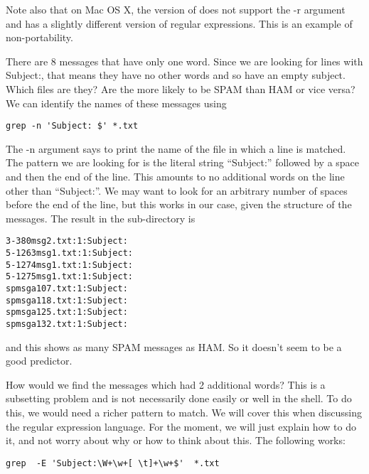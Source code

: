 Note also that on Mac OS X,  the version of  does not 
support the -r argument and has a slightly different version of
regular expressions.  This is an example of non-portability.

There are 8 messages that have only one word. Since we
are looking for lines with Subject:, that means they have
no other words and so have an empty subject.
Which files are they?  Are the more likely to be SPAM than HAM or
vice versa?
We can identify the names of these messages using
\begin{verbatim}
grep -n 'Subject: $' *.txt
\end{verbatim}
The -n argument says to print the name of the file in which a line is
matched.
The pattern we are looking for is the literal string ``Subject:''
followed by a space and then the end of the line.
This amounts to no additional words on the line other than ``Subject:''.
We may want to look for an arbitrary number of spaces before the end
of the line, but this works in our case, given the structure of the messages.
The result in the  sub-directory is
\begin{verbatim}
3-380msg2.txt:1:Subject: 
5-1263msg1.txt:1:Subject: 
5-1274msg1.txt:1:Subject: 
5-1275msg1.txt:1:Subject: 
spmsga107.txt:1:Subject: 
spmsga118.txt:1:Subject: 
spmsga125.txt:1:Subject: 
spmsga132.txt:1:Subject: 
\end{verbatim}
and this shows as many SPAM messages as HAM. So it doesn't seem to be
a good predictor.




\begin{comment}
Another approach to the whole problem is to iterate over all the
messages
and append the name of the message file to a ``list'' containing other
messages with that number of words in the subject line.
\begin{verbatim}
for i in `ls *.txt` ; do 
  grep 'Subject:' $i | wc -w | grep -v total | sed -re 's/^ +([0-9]+).*$/\1/g' ; done | sort | uniq -c
\end{verbatim}
\end{comment}


How would we find the messages which had 2 additional words?
This is a subsetting problem and is not necessarily done easily or
well in the shell. 
To do this, we would need a richer pattern to match.
We will cover this when discussing the regular expression
language.
For the moment, we will just explain how to do it, 
and not worry about why or how to think about this.
The following works:
\begin{verbatim}
grep  -E 'Subject:\W+\w+[ \t]+\w+$'  *.txt 
\end{verbatim}


